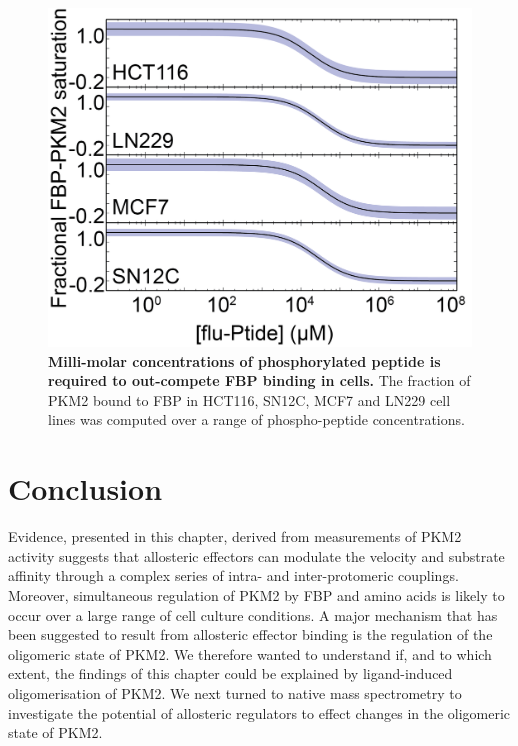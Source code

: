 \begin{figure}[!ht]
\includegraphics[scale=0.8]{ch4_fig13_peptide_simulation.png}
\caption[Milli-molar concentrations of phosphorylated peptide is required to out-compete FBP binding in cells.] {\textbf{Milli-molar concentrations of phosphorylated peptide is required to out-compete FBP binding in cells.} The fraction of PKM2 bound to FBP in HCT116, SN12C, MCF7 and LN229 cell lines was computed over a range of phospho-peptide concentrations.}
\label{fig:peptide_sim}
\end{figure}
%
%
\clearpage

\section{Conclusion}
Evidence, presented in this chapter, derived from measurements of PKM2 activity suggests that allosteric effectors can modulate the velocity and substrate affinity through a complex series of intra- and inter-protomeric couplings. Moreover, simultaneous regulation of PKM2 by FBP and amino acids is likely to occur over a large range of cell culture conditions. A major mechanism that has been suggested to result from allosteric effector binding is the regulation of the oligomeric state of PKM2. We therefore wanted to understand if, and to which extent, the findings of this chapter could be explained by ligand-induced oligomerisation of PKM2. We next turned to native mass spectrometry to investigate the potential of allosteric regulators to effect changes in the oligomeric state of PKM2.



















 
